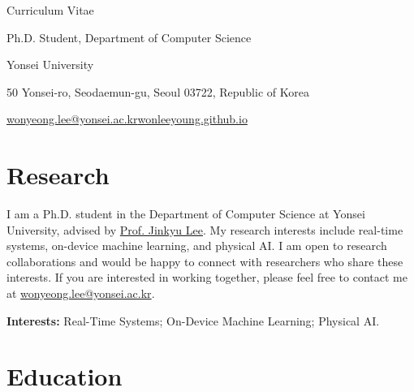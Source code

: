 
\hfill{\small Curriculum Vitae}\par

\vspace{0.5em}

Ph.D. Student, Department of Computer Science\par

Yonsei University\par

{\small 50 Yonsei-ro, Seodaemun-gu, Seoul 03722, Republic of Korea}\par

\vspace{0.25em}

\href{mailto:wonyeong.lee@yonsei.ac.kr}{wonyeong.lee@yonsei.ac.kr}\quad\textperiodcentered{}\quad\href{https://wonleeyoung.github.io/}{wonleeyoung.github.io}\par

\vspace{0.25em}

\section{Research}

I am a Ph.D. student in the Department of Computer Science at Yonsei University, advised by \href{https://rtcl-yonsei.github.io/website/}{Prof. Jinkyu Lee}. My research interests include real-time systems, on-device machine learning, and physical AI. I am open to research collaborations and would be happy to connect with researchers who share these interests. If you are interested in working together, please feel free to contact me at \href{mailto:wonyeong.lee@yonsei.ac.kr}{wonyeong.lee@yonsei.ac.kr}.\par

\vspace{0.45em}

\textbf{Interests:} Real-Time Systems; On-Device Machine Learning; Physical AI.

\section{Education}



